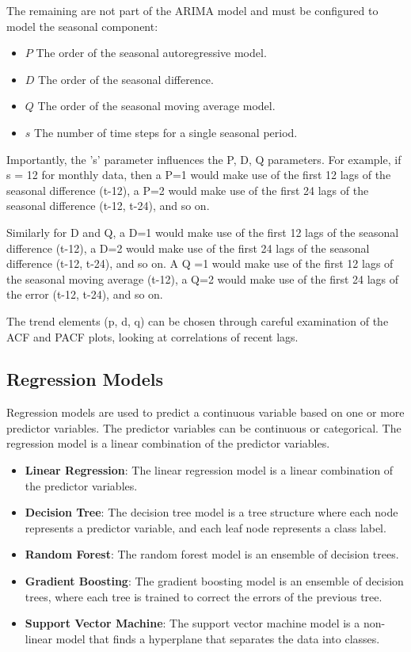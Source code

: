 \documentclass[manuscript,screen,nonacm,11pt]{acmart}                                                          %
\numberwithin{equation}{section}
\begin{document}
The remaining are not part of the ARIMA model and must be configured to
model the seasonal component:
\begin{itemize}
\item $P$ The order of the seasonal autoregressive model.
\item $D$ The order of the seasonal difference.
\item $Q$ The order of the seasonal moving average model.
\item $s$ The number of time steps for a single seasonal period.
\end{itemize}

Importantly, the 's' parameter influences the P, D, Q parameters. 
For example, if s = 12 for monthly data, then a P=1 would make use of 
the first 12 lags of the seasonal difference (t-12), a P=2 would make 
use of the first 24 lags of the seasonal difference (t-12, t-24), and so on.

Similarly for D and Q, a D=1 would make use of the first 12 lags of 
the seasonal difference (t-12), a D=2 would make use of the first 24
lags of the seasonal difference (t-12, t-24), and so on. 
A Q =1 would make use of the first 12 lags of the seasonal moving 
average (t-12), a Q=2 would make use of the first 24 lags of the error
(t-12, t-24), and so on.

The trend elements (p, d, q) can be chosen through careful examination 
of the ACF and PACF plots, looking at correlations of recent lags.


\subsection{Regression Models}
Regression models are used to predict a continuous variable based on one or more predictor variables. The predictor variables can be continuous or categorical. The regression model is a linear combination of the predictor variables.

\begin {itemize}
\item \textbf{Linear Regression}: The linear regression model is a linear combination of the predictor variables.
\item \textbf{Decision Tree}: The decision tree model is a tree structure where each node represents a predictor variable, and each leaf node represents a class label.
\item \textbf{Random Forest}: The random forest model is an ensemble of decision trees.
\item \textbf{Gradient Boosting}: The gradient boosting model is an ensemble of decision trees, where each tree is trained to correct the errors of the previous tree.
\item \textbf{Support Vector Machine}: The support vector machine model is a non-linear model that finds a hyperplane that separates the data into classes.

\end{itemize}
\end{document}
